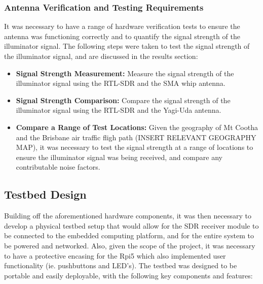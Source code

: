 \subsubsection{Antenna Verification and Testing Requirements}
It was necessary to have a range of hardware verification tests to ensure the antenna was functioning correctly and to quantify the signal strength of the illuminator signal. The following steps were taken to test the signal strength of the illuminator signal, and are discussed in the results section:
\begin{itemize}
    \item \textbf{Signal Strength Measurement:} Measure the signal strength of the illuminator signal using the RTL-SDR and the SMA whip antenna.
    \item \textbf{Signal Strength Comparison:} Compare the signal strength of the illuminator signal using the RTL-SDR and the Yagi-Uda antenna.
    \item \textbf{Compare a Range of Test Locations:} Given the geography of Mt Cootha and the Brisbane air traffic fligh path (INSERT RELEVANT GEOGRAPHY MAP), it was necessary to test the signal strength at a range of locations to ensure the illuminator signal was being received, and compare any contributable noise factors.
\end{itemize}


\subsection{Testbed Design \label{sec:testbed}}
Building off the aforementioned hardware components, it was then necessary to develop a physical testbed setup that would allow for the SDR receiver module to be connected to the embedded computing platform, and for the entire system to be powered and networked. Also, given the scope of the project, it was necessary to have a protective encasing for the Rpi5 which also implemented user functionality (ie. pushbuttons and LED's). The testbed was designed to be portable and easily deployable, with the following key components and features:



